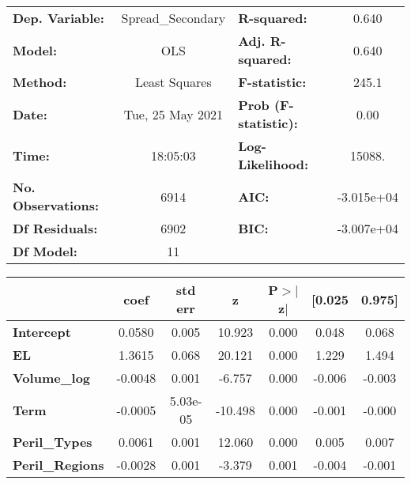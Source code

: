 \begin{center}
\begin{tabular}{lclc}
\toprule
\textbf{Dep. Variable:}           & Spread\_Secondary & \textbf{  R-squared:         } &     0.640   \\
\textbf{Model:}                   &        OLS        & \textbf{  Adj. R-squared:    } &     0.640   \\
\textbf{Method:}                  &   Least Squares   & \textbf{  F-statistic:       } &     245.1   \\
\textbf{Date:}                    &  Tue, 25 May 2021 & \textbf{  Prob (F-statistic):} &     0.00    \\
\textbf{Time:}                    &      18:05:03     & \textbf{  Log-Likelihood:    } &    15088.   \\
\textbf{No. Observations:}        &         6914      & \textbf{  AIC:               } & -3.015e+04  \\
\textbf{Df Residuals:}            &         6902      & \textbf{  BIC:               } & -3.007e+04  \\
\textbf{Df Model:}                &           11      & \textbf{                     } &             \\
\bottomrule
\end{tabular}
\begin{tabular}{lcccccc}
                                  & \textbf{coef} & \textbf{std err} & \textbf{z} & \textbf{P$> |$z$|$} & \textbf{[0.025} & \textbf{0.975]}  \\
\midrule
\textbf{Intercept}                &       0.0580  &        0.005     &    10.923  &         0.000        &        0.048    &        0.068     \\
\textbf{EL}                       &       1.3615  &        0.068     &    20.121  &         0.000        &        1.229    &        1.494     \\
\textbf{Volume\_log}              &      -0.0048  &        0.001     &    -6.757  &         0.000        &       -0.006    &       -0.003     \\
\textbf{Term}                     &      -0.0005  &     5.03e-05     &   -10.498  &         0.000        &       -0.001    &       -0.000     \\
\textbf{Peril\_Types}             &       0.0061  &        0.001     &    12.060  &         0.000        &        0.005    &        0.007     \\
\textbf{Peril\_Regions}           &      -0.0028  &        0.001     &    -3.379  &         0.001        &       -0.004    &       -0.001     \\

\end{tabular}
\end{center}
